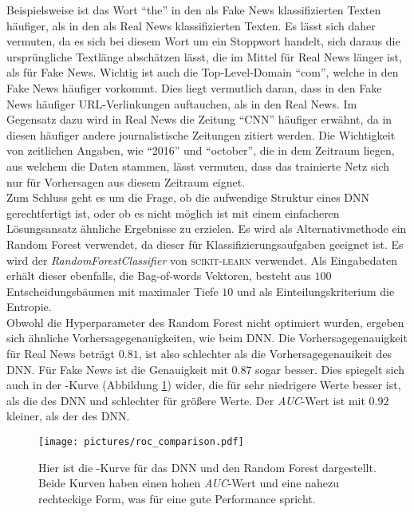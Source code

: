 Beispielsweise ist das Wort \enquote{the} in den als Fake News klassifizierten Texten häufiger, als in den als 
Real News klassifizierten Texten. Es lässt sich daher vermuten, da es sich bei diesem Wort um 
ein Stoppwort handelt, sich daraus die ursprüngliche Textlänge abschätzen lässt, die im Mittel
für Real News länger ist, als für Fake News. Wichtig ist auch die Top-Level-Domain \enquote{com},
welche in den Fake News häufiger vorkommt. Dies liegt vermutlich daran, dass in den Fake News 
häufiger URL-Verlinkungen auftauchen, als in den Real News. Im Gegensatz dazu wird in Real News 
die Zeitung \enquote{CNN} häufiger erwähnt, da in diesen häufiger andere journalistische 
Zeitungen zitiert werden. Die Wichtigkeit von zeitlichen Angaben, wie \enquote{2016} und \enquote{october},
die in dem Zeitraum liegen, aus welchem die Daten stammen, lässt vermuten, dass das trainierte 
Netz sich nur für Vorhersagen aus diesem Zeitraum eignet.\\
Zum Schluss geht es um die Frage, ob die aufwendige Struktur eines DNN gerechtfertigt ist, oder 
ob es nicht möglich ist mit einem einfacheren Lösungsansatz ähnliche Ergebnisse zu erzielen. Es 
wird als Alternativmethode ein Random Forest verwendet, da dieser für Klassifizierungsaufgaben 
geeignet ist. Es wird der \textit{RandomForestClassifier} von \textsc{scikit-learn} verwendet.
Als Eingabedaten erhält dieser ebenfalls, die Bag-of-words Vektoren, besteht 
aus $100$ Entscheidungsbäumen mit maximaler Tiefe $10$ und als Einteilungskriterium die Entropie.\\
Obwohl die Hyperparameter des Random Forest nicht optimiert wurden, ergeben sich ähnliche 
Vorhersagegenauigkeiten, wie beim DNN. Die Vorhersagegenauigkeit für Real News beträgt 
$0.81$, ist also schlechter als die Vorhersagegenauikeit des DNN. Für Fake 
News ist die Genauigkeit mit $0.87$ sogar besser. Dies spiegelt sich auch in der 
-Kurve (Abbildung \ref{fig:roc}) wider, die für sehr niedrigere Werte besser ist,
als die des DNN und schlechter für größere Werte. Der \textit{AUC}-Wert ist mit 
$0.92$ kleiner, als der des DNN.\\
\begin{figure}
    \centering
    \texttt{[image: pictures/roc\_comparison.pdf]}
    \caption{Hier ist die -Kurve für das DNN und den Random Forest dargestellt.
    Beide Kurven haben einen hohen \textit{AUC}-Wert und eine nahezu rechteckige Form,
    was für eine gute Performance spricht.}
    \label{fig:roc}
\end{figure}


